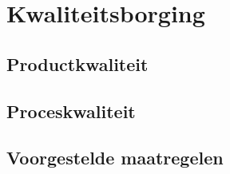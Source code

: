 \section{Kwaliteitsborging}
\subsection{Productkwaliteit}
\subsection{Proceskwaliteit}
\subsection{Voorgestelde maatregelen}
